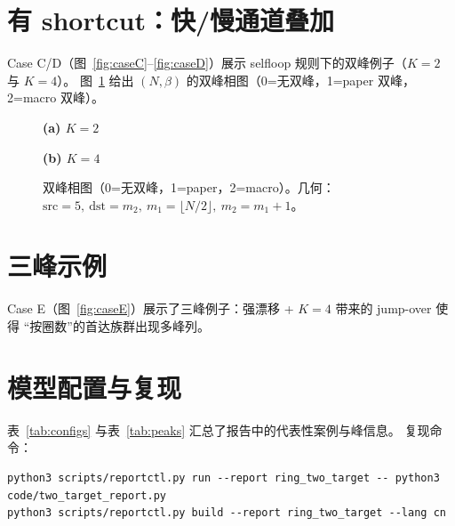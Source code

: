 \documentclass[11pt]{ctexart}
\begin{document}
\section*{有 shortcut：快/慢通道叠加}
Case C/D（图~\ref{fig:caseC}--\ref{fig:caseD}）展示 selfloop 规则下的双峰例子（$K=2$ 与 $K=4$）。
图~\ref{fig:scan} 给出 $(N,\beta)$ 的双峰相图（0=无双峰，1=paper 双峰，2=macro 双峰）。

\begin{figure}[!htbp]
  \centering
  \begin{minipage}{0.45\linewidth}
    \centering
    \textbf{(a) $K=2$}\par
  \end{minipage}%
  \hfill
  \begin{minipage}{0.45\linewidth}
    \centering
    \textbf{(b) $K=4$}\par
  \end{minipage}
  \caption{双峰相图（0=无双峰，1=paper，2=macro）。几何：$\mathrm{src}=5,\ \mathrm{dst}=m_2,\ m_1=\lfloor N/2\rfloor,\ m_2=m_1+1$。}
  \label{fig:scan}
\end{figure}

\section*{三峰示例}
Case E（图~\ref{fig:caseE}）展示了三峰例子：强漂移 + $K=4$ 带来的 jump-over 使得
“按圈数”的首达族群出现多峰列。

\section*{模型配置与复现}
表~\ref{tab:configs} 与表~\ref{tab:peaks} 汇总了报告中的代表性案例与峰信息。
复现命令：
\begin{verbatim}
python3 scripts/reportctl.py run --report ring_two_target -- python3 code/two_target_report.py
python3 scripts/reportctl.py build --report ring_two_target --lang cn
\end{verbatim}
\end{document}
